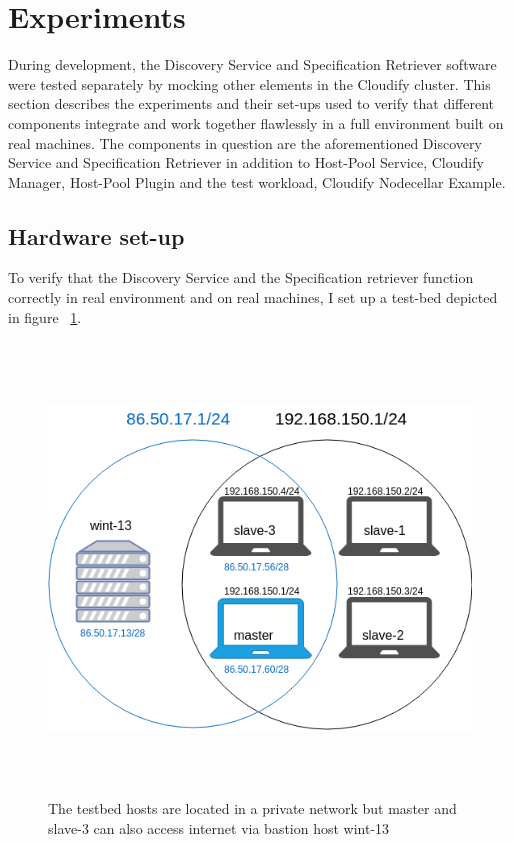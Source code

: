 \section{Experiments}

During development, the Discovery Service and Specification Retriever software were tested separately by mocking other elements in the Cloudify cluster. This section describes the experiments and their set-ups used to verify that different components integrate and work together flawlessly in a full environment built on real machines. The components in question are the aforementioned Discovery Service and Specification Retriever in addition to Host-Pool Service, Cloudify Manager, Host-Pool Plugin and the test workload, Cloudify Nodecellar Example\cite{Nodecellar}.

\subsection{Hardware set-up}
To verify that the Discovery Service and the Specification retriever function correctly in real environment and on real machines, I set up a test-bed depicted in figure ~\ref{fig:network-venn}.

 \begin{figure}[ht!]
\centering
  \includegraphics[width=12cm,height=12cm, keepaspectratio]{Network-venn.png}%
  \caption{The testbed hosts are located in a private network but master and slave-3 can also access internet via bastion host wint-13}
  \label{fig:network-venn}
\end{figure}

